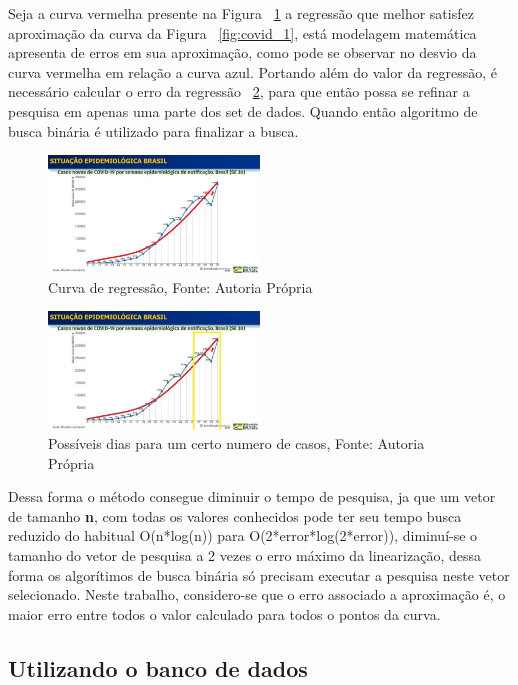 Seja a curva vermelha presente na Figura ~\ref{fig:covid_2} a regressão que melhor satisfez aproximação da curva da Figura ~\ref{fig:covid_1}, 
está modelagem matemática apresenta de erros em sua aproximação, como pode se observar no desvio da curva vermelha em relação a curva azul.
Portando além do valor da regressão, é necessário calcular o erro da regressão ~\ref{fig:covid_3}, para que então possa se refinar a pesquisa em apenas uma parte dos set de dados.
Quando então algoritmo de busca binária é utilizado para finalizar a busca.
\begin{figure}[H]
    \centering
    \includegraphics[width=0.5\textwidth]{images/covid_2.jpg}
    \caption{Curva de regressão, Fonte: Autoria Própria}
    \label{fig:covid_2}
\end{figure}

\begin{figure}[H]
    \centering
    \includegraphics[width=0.5\textwidth]{images/covid_3.jpg}
    \caption{Possíveis dias para um certo numero de casos, Fonte: Autoria Própria}
    \label{fig:covid_3}
\end{figure}

Dessa forma o método consegue diminuir o tempo de pesquisa, ja que um vetor de tamanho \textbf{n}, com todas os valores conhecidos pode ter seu tempo busca reduzido do habitual O(n*log(n)) para O(2*error*log(2*error)), 
diminuí-se o tamanho do vetor de pesquisa a 2 vezes o erro máximo da linearização, dessa forma os algorítimos de busca binária só precisam executar a pesquisa neste vetor selecionado.
Neste trabalho, considero-se que o erro associado a aproximação é, o maior erro entre todos o valor calculado para todos o pontos da curva.

\subsection{Utilizando  o banco de dados}

